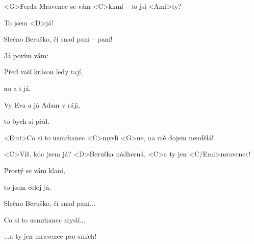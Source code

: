 

\zs
 <G>Ferda Mravenec se vám <C>klaní -- to jsi <Ami>ty?

 To jsem <D>já!

 Slečno Beruško, či snad paní -- paní!

 Já povím vám:
\ks

\zs
 Před vaší krásou ledy tají,

 no a i já.

 Vy Eva a já Adam v ráji,

 to bych si přál.
\ks

\zr
 <Emi>Co si to usmrkanec <C>myslí <G>ne, na mě dojem neudělá!

 <C>Víš, kdo jsem já? <D>Beruška nádherná, <C>a ty jen <C/Emi>mravenec!
\kr

\zs
 Prostý se vám klaní,

 to jsem celej já.

 Slečno Beruško, či snad paní...
\ks

\zr
 Co si to usmrkanec myslí...

 ...a ty jen mravenec pro smích!
\kr

\kp
